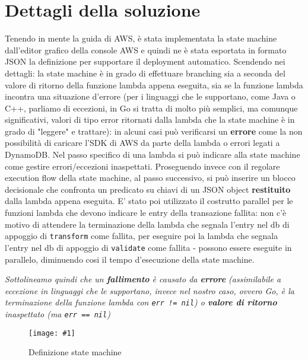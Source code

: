 \documentclass[
    sigconf, 
    screen=false, 
    acmthm=false, 
    nonacm
]{acmart}
\def\maxpicwidth{8.15cm}
\newcommand{\pichere}[3] {
\begin{figure}[H]
\centering
\texttt{[image: \#1]}
\caption{#3}
\end{figure}
}
\begin{document}
\section{Dettagli della soluzione}
Tenendo in mente la guida \cite{awsguide} di AWS, è stata implementata la state machine dall'editor grafico della
console AWS e quindi ne è stata esportata in formato JSON la definizione \cite{amazonasl} per supportare il 
deployment automatico. Scendendo nei dettagli: la state
machine è in grado di effettuare branching sia a seconda del valore di ritorno della funzione lambda appena
eseguita, sia se la funzione lambda incontra una situazione d'errore (per i linguaggi che le supportano, come Java
o C++, parliamo di eccezioni, in Go si tratta di molto più semplici, ma comunque significativi, valori di tipo 
error \cite{goerrors} ritornati dalla lambda che la state machine è in grado di "leggere" e trattare): in alcuni casi può verificarsi un \textbf{errore} come la non possibilità di caricare l'SDK di AWS da parte
della lambda o errori legati a DynamoDB. Nel passo specifico di una lambda si può indicare alla state machine come
gestire errori/eccezioni inaspettati. Proseguendo invece con il regolare execution flow della state machine, al passo successivo, si può inserire un blocco decisionale che 
confronta un predicato su chiavi di un JSON object \textbf{restituito} dalla lambda appena eseguita. E' stato poi
utilizzato il costrutto parallel per le funzioni lambda che devono indicare le entry della transazione fallita: non 
c'è motivo di attendere la terminazione della lambda che segnala l'entry nel db di appoggio di \texttt{transform} come fallita, per 
eseguire poi la lambda che segnala l'entry nel db di appoggio di \texttt{validate} come fallita - possono essere eseguite in parallelo,
diminuendo cosi il tempo d'esecuzione della state machine.

\textit{Sottolineamo quindi che un \textbf{fallimento} è causato da \textbf{errore} (assimilabile a eccezione in linguaggi che le supportano, invece nel nostro caso, ovvero Go, è la terminazione della funzione lambda con \texttt{err != nil}) o \textbf{valore di ritorno} inaspettato (ma \texttt{err == nil})}

\pichere{whole-sfn}{5cm}{Definizione state machine}
\end{document}
